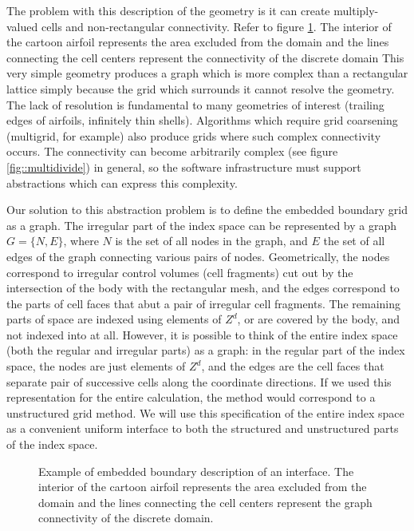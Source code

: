 The problem with this description of the geometry 
is it can create  multiply-valued cells and
non-rectangular connectivity.
Refer to figure \ref{fig::graph}.  
The interior of the cartoon airfoil represents the area
excluded from the domain and the lines connecting the cell centers
represent the connectivity of the discrete domain
This very simple geometry produces a graph
which is more complex than a rectangular lattice simply because
the grid which surrounds it cannot resolve the geometry.
The lack of resolution is fundamental to many geometries 
of interest (trailing edges of airfoils, infinitely thin shells).
Algorithms which require grid coarsening (multigrid, for example)
also produce grids where such complex connectivity occurs.
The connectivity can become arbitrarily complex (see figure 
\ref{fig::multidivide}) in general, so the software infrastructure
must support abstractions which can express this complexity.

Our solution to this abstraction problem is to
define the embedded boundary grid as a graph.
The irregular part of the index space can be represented by a graph 
$G = \{N,E\}$, where $N$ is the set of all nodes in the graph, and 
$E$ the set of all edges of the graph connecting various pairs of 
nodes. Geometrically,
the nodes correspond to irregular control volumes (cell fragments) 
cut out by the intersection of the body with the rectangular mesh, and 
the edges correspond to the parts of cell faces that abut a pair of irregular 
cell fragments. The remaining parts of space are indexed using elements
of $Z^d$, or are covered by the body, and not indexed into at all. However,
it is possible to think of the entire index space (both the regular and
irregular parts) as a graph: in the regular part of the index space,
the nodes are just elements of $Z^d$, and the 
edges are the cell faces that
separate pair of successive cells along the coordinate directions. If we
used this representation for the entire calculation, the method would
correspond to a unstructured grid method. We will use this
specification of the entire index space as a convenient uniform
interface to both the structured and unstructured parts  of the index
space. 


\begin{figure}
\epsfxsize=4.0in
\hspace{1.0in} 
\caption{Example of embedded boundary description of an interface. 
The interior of the cartoon airfoil represents the area
excluded from the domain and the lines connecting the cell centers
represent the graph connectivity of the discrete domain.    }
\label{fig::graph}
\end{figure}

